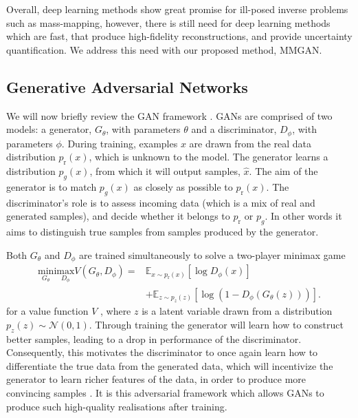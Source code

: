 \documentclass[fleqn,usenatbib]{mnras}
\begin{document}
Overall, deep learning methods show great promise for ill-posed inverse problems such as mass-mapping, however, there is still need for deep learning methods which are fast, that produce high-fidelity reconstructions, and provide uncertainty quantification. We address this need with our proposed method, MMGAN.

\subsection{Generative Adversarial Networks}\label{subsec:gan}

We will now briefly review the GAN framework \citep{goodfellow2014generative}. GANs are comprised of two models: 
a generator, $G_\theta$, with parameters $\theta$ and a discriminator, $D_\phi$, with parameters $\phi$. During training, examples $x$ are drawn from the real data distribution $p_{\text{r}}(x)$, which is unknown to the model. The generator learns a distribution $p_{g}(x)$, from which it will output samples, $\hat{x}$. The aim of the generator is to match $p_{g}(x)$ as closely as possible to $p_{\text{r}}(x)$. The discriminator's role is to assess incoming data (which is a mix of real and generated samples), and decide whether it belongs to $p_{\text{r}}$ or $p_{g}$. In 
other words it aims to distinguish true samples from samples produced by the generator.

Both $G_\theta$ and $D_\phi$ are trained simultaneously to solve a two-player minimax game
\begin{equation}\label{eq:value_function}
	\begin{split}
		\underset{G_\theta}{\text{min}}\text{i}\underset{D_\phi}{\text{max}} V (G_\theta,D_\phi) = & \mathbb{E}_{x \sim p_{\text{r}}(x)}[\log D_\phi(x)] \\ 
		& + \mathbb{E}_{z \sim p_{z}(z)}[\log(1 - D_\phi(G_\theta(z)))].
	\end{split}
\end{equation}
for a value function $V$ \citep[see][]{goodfellow2014generative}, where $z$ is a latent variable drawn from a distribution $p_{z}(z) \sim \mathcal{N}(0, 1)$. Through training the generator will learn how to construct better samples, leading to a drop in performance of the discriminator. Consequently, this motivates the discriminator to once again learn how to differentiate the true data from the generated data, which will incentivize the generator to learn richer features of the data, in order to produce more convincing samples \citep{saxena2021generative}. It is this adversarial framework which allows GANs to produce such high-quality realisations after training.
\end{document}
